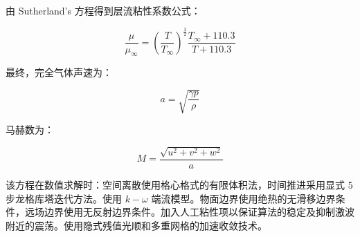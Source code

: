 由 Sutherland's 方程得到层流粘性系数公式：

\begin{equation}
\frac{\mu}{\mu_\infty} = \left( \frac{T}{T_\infty} \right)^{\frac{3}{2}} \frac{T_\infty + 110.3}{T + 110.3} \tag{4-14}
\end{equation}

最终，完全气体声速为：

\begin{equation}
a = \sqrt{\frac{\gamma p}{\rho}} \tag{4-15}
\end{equation}

马赫数为：

\begin{equation}
M = \frac{\sqrt{u^2 + v^2 + w^2}}{a} \tag{4-16}
\end{equation}

该方程在数值求解时：空间离散使用格心格式的有限体积法，时间推进采用显式 5 步龙格库塔迭代方法。使用 \(k-\omega\) 端流模型。物面边界使用绝热的无滑移边界条件，远场边界使用无反射边界条件。加入人工粘性项以保证算法的稳定及抑制激波附近的震荡。使用隐式残值光顺和多重网格的加速收敛技术。



